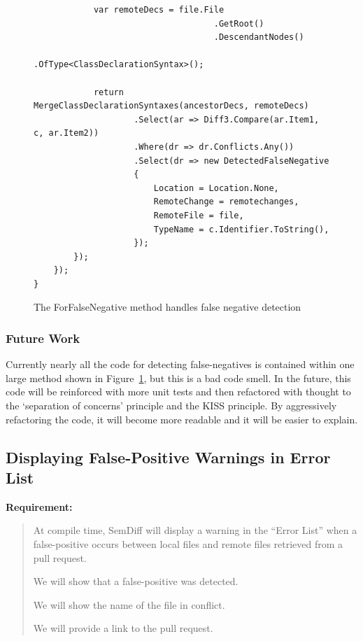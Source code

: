 \documentclass[draftclsnofoot,onecolumn]{IEEEtran}
\begin{document}
\begin{figure}[!htb]
\begin{lstlisting}
            var remoteDecs = file.File
                                    .GetRoot()
                                    .DescendantNodes()
                                    .OfType<ClassDeclarationSyntax>();

            return MergeClassDeclarationSyntaxes(ancestorDecs, remoteDecs)
                    .Select(ar => Diff3.Compare(ar.Item1, c, ar.Item2))
                    .Where(dr => dr.Conflicts.Any())
                    .Select(dr => new DetectedFalseNegative
                    {
                        Location = Location.None,
                        RemoteChange = remotechanges,
                        RemoteFile = file,
                        TypeName = c.Identifier.ToString(),
                    });
        });
    });
}
\end{lstlisting}
\caption{The ForFalseNegative method handles false negative detection}
\label{anforfn}
\end{figure}

\subsubsection{Future Work}

Currently nearly all the code for detecting false-negatives is contained within 
one large method shown in Figure~\ref{anforfn}, but this is a bad code smell. 
In the future, this code will be reinforced with more unit tests and then 
refactored with thought to the ‘separation of concerns’ principle and the KISS 
principle. By aggressively refactoring the code, it will become more readable 
and it will be easier to explain.

\subsection{Displaying False-Positive Warnings in Error List}%

\textbf{Requirement:}

\begin{quote}

At compile time, SemDiff will display a warning in the “Error List” when a 
false-positive occurs between local files and remote files retrieved from a 
pull request.

We will show that a false-positive was detected.

We will show the name of the file in conflict.

We will provide a link to the pull request.

\end{quote}
\end{document}
